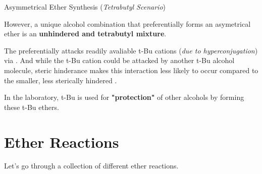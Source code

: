 \documentclass[10pt]{article}
\begin{document}
  \begin{core}[label=core:tbu]{Asymmetrical Ether Synthesis (\textit{Tetrabutyl Scenario})}
    
    However, a unique alcohol combination that preferentially forms an asymetrical ether is an \textbf{unhindered  and tetrabutyl mixture}.


    The  preferentially attacks readily avaliable t-Bu cations (\textit{due to hyperconjugation}) via \sno. And while the t-Bu cation could be attacked by another t-Bu alcohol molecule, steric hinderance makes this interaction less likely to occur compared to the smaller, less sterically hindered .

    In the laboratory, t-Bu is used for \textbf{"protection"} of other alcohols by forming these t-Bu ethers.

  \end{core}
  
\section{Ether Reactions}

  Let's go through a collection of different ether reactions.
\end{document}

